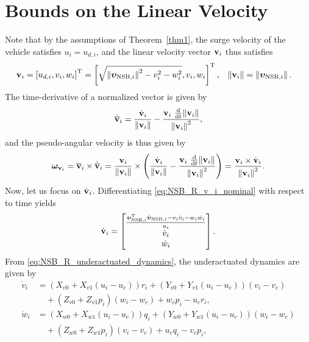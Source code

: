 \section{Bounds on the Linear Velocity}
\label{app:omega_v}
Note that by the assumptions of Theorem~\ref{thm1}, the surge velocity of the vehicle satisfies $u_i = u_{d, i}$, and the linear velocity vector $\mathbf{v}_i$ thus  satisfies
\begin{align}
    \mathbf{v}_i &= \left[u_{d,i}, v_i, w_i\right]^{\mathrm{T}} = \left[\sqrt{\left\|\bm{\upsilon}_{{\rm NSB}, i}\right\|^2 - v_i^2 - w_i^2}, v_i, w_i\right]^{\mathrm{T}}, &
    \left\|\mathbf{v}_i\right\| &= \left\|\bm{\upsilon}_{{\rm NSB}, i}\right\|.
    \label{eq:NSB_R_v_i_nominal}
\end{align}
The time-derivative of a normalized vector is given by
\begin{equation}
    \dot{\overline{\mathbf{v}}}_i = \frac{\dot{\mathbf{v}}_i}{\left\|\mathbf{v}_i\right\|} - \frac{\mathbf{v}_i\,\,\frac{\rm d}{{\rm d}t}\!\left\|\mathbf{v}_i\right\|}{\left\|\mathbf{v}_i\right\|^2},
\end{equation}
and the pseudo-angular velocity is thus given by
\begin{equation}
    \bm{\omega}_{\mathbf{v}_i} = \overline{\mathbf{v}}_i \times \dot{\overline{\mathbf{v}}}_i
    = \frac{\mathbf{v}_i}{\left\|\mathbf{v}_i\right\|} \times 
        \left(\frac{\dot{\mathbf{v}}_i}{\left\|\mathbf{v}_i\right\|} - \frac{\mathbf{v}_i\,\,\frac{\rm d}{{\rm d}t}\!\left\|\mathbf{v}_i\right\|}{\left\|\mathbf{v}_i\right\|^2}\right)
    = \frac{\mathbf{v}_i \times \dot{\mathbf{v}}_i}{\left\|\mathbf{v}_i\right\|^2}.
    \label{eq:NSB_R_omega_v_a1}
\end{equation}
Now, let us focus on $\dot{\mathbf{v}}_i$.
Differentiating \eqref{eq:NSB_R_v_i_nominal} with respect to time yields
\begin{equation}
    \dot{\mathbf{v}}_i = \begin{bmatrix}
        \frac{\bm{\upsilon}_{{\rm NSB}, i}^{\mathrm{T}}\dot{\bm{\upsilon}}_{{\rm NSB}, i} - v_i\dot{v}_i - w_i\dot{w}_i}{u_i} \\
        \dot{v}_i \\
        \dot{w}_i
    \end{bmatrix}.
    \label{eq:NSB_R_v_i_dot}
\end{equation}
From \eqref{eq:NSB_R_underactuated_dynamics}, the underactuated dynamics are given by
\begin{subequations}
    \begin{align}
        \dot{v}_i &= \left(X_{v0} + X_{v1}(u_i-u_c)\right)r_i + \left(Y_{v0} + Y_{v1}(u_i-u_c)\right)(v_i-v_c) \nonumber \\
        &\quad + \left(Z_{v0} + Z_{v1}p_i\right)(w_i-w_c) + w_cp_i - u_cr_i, \\
        \dot{w}_i &= \left(X_{w0} + X_{w1}(u_i-u_c)\right)q_i + \left(Y_{w0} + Y_{w1}(u_i-u_c)\right)(w_i-w_c) \nonumber \\
        &\quad + \left(Z_{w0} + Z_{w1}p_i\right)(v_i-v_c) + u_cq_i - v_cp_i,
    \end{align}
    \label{eq:NSB_R_underactuated_dynamics_expanded}
\end{subequations}
